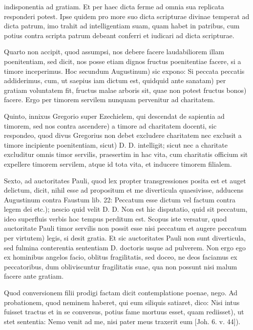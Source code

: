 indisponentia ad gratiam. Et per haec dicta ferme ad omnia sua replicata responderi potest. Ipse quidem pro more suo dicta scripturae divinae temperat ad dicta patrum, imo trahit ad intelligentiam suam, quam habet in patribus, cum potius contra scripta patrum debeant conferri et iudicari ad dicta scripturae.

Quarto non accipit, quod assumpsi, nos debere facere laudabiliorem illam poenitentiam, sed dicit, nos posse etiam dignos fructus poenitentiae facere, si a timore inceperimus. Hoc secundum Augustinum) sic expono: Si peccata peccatis addiderimus, cum, ut saepius iam dictum est, quidquid ante sanatam) per gratiam voluntatem fit, fructus malae arboris sit, quae non potest fructus bonos) facere. Ergo per timorem servilem nunquam pervenitur ad charitatem.

Quinto, innixus Gregorio super Ezechielem, qui descendat de sapientia ad timorem, sed nos contra ascendere) a timore ad charitatem docenti, sic respondeo, quod divus Gregorius non debet excludere charitatem nec exclusit a timore incipiente poenitentiam, sicut) D. D. intelligit; sicut nec a charitate excluditur omnis timor servilis, praesertim in hac vita, cum charitatis officium sit expellere timorem servilem, atque id tota vita, et inducere timorem filialem.

Sexto, ad auctoritates Pauli, quod lex propter transgressiones posita est et auget delictum, dicit, nihil esse ad propositum et me diverticula quaesivisse, adducens Augustinum contra Faustum lib. 22: Peccatum esse dictum vel factum contra legem dei etc.); nescio quid velit D. D. Non est hic disputatio, quid sit peccatum, ideo superfluis verbis hoc tempus perditum est. Scopus iste versatur, quod auctoritate Pauli timor servilis non possit esse nisi peccatum et augere peccatum per virtutem) legis, si desit gratia. Et sic auctoritates Pauli non sunt diverticula, sed fulmina conterentia sententiam D. doctoris usque ad pulverem. Non ergo ego ex hominibus angelos facio, oblitus fragilitatis, sed doceo, ne deos faciamus ex peccatoribus, dum obliviscuntur fragilitatis suae, qua non possunt nisi malum facere ante gratiam.

Quod conversionem filii prodigi factam dicit contemplatione poenae, nego. Ad probationem, quod neminem haberet, qui eum siliquis satiaret, dico: Nisi intus fuisset tractus et in se conversus, potius fame mortuus esset, quam rediisset), ut stet sententia: Nemo venit ad me, nisi pater meus traxerit eum [Joh. 6. v. 44]).

